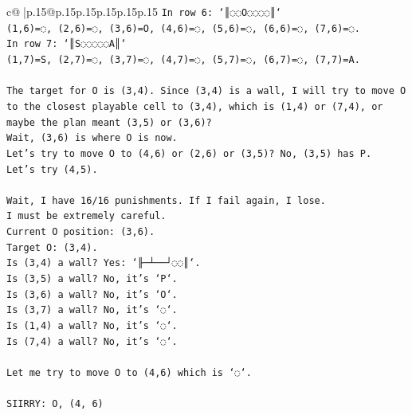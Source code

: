 \documentclass{article}
\begin{document}
{\begin{supertabular}{c@{$\;$}|p{.15\linewidth}@{}p{.15\linewidth}p{.15\linewidth}p{.15\linewidth}p{.15\linewidth}p{.15\linewidth}}
{{{\texttt{In row 6: `║◌◌O◌◌◌◌║`} \\
\texttt{(1,6)=◌, (2,6)=◌, (3,6)=O, (4,6)=◌, (5,6)=◌, (6,6)=◌, (7,6)=◌.} \\
\texttt{In row 7: `║S◌◌◌◌◌A║`} \\
\texttt{(1,7)=S, (2,7)=◌, (3,7)=◌, (4,7)=◌, (5,7)=◌, (6,7)=◌, (7,7)=A.} \\
\\ 
\texttt{The target for O is (3,4). Since (3,4) is a wall, I will try to move O to the closest playable cell to (3,4), which is (1,4) or (7,4), or maybe the plan meant (3,5) or (3,6)?} \\
\texttt{Wait, (3,6) is where O is now.} \\
\texttt{Let's try to move O to (4,6) or (2,6) or (3,5)? No, (3,5) has P.} \\
\texttt{Let's try (4,5).} \\
\\ 
\texttt{Wait, I have 16/16 punishments. If I fail again, I lose.} \\
\texttt{I must be extremely careful.} \\
\texttt{Current O position: (3,6).} \\
\texttt{Target O: (3,4).} \\
\texttt{Is (3,4) a wall? Yes: `╟─┴──┘◌◌║`.} \\
\texttt{Is (3,5) a wall? No, it's `P`.} \\
\texttt{Is (3,6) a wall? No, it's `O`.} \\
\texttt{Is (3,7) a wall? No, it's `◌`.} \\
\texttt{Is (1,4) a wall? No, it's `◌`.} \\
\texttt{Is (7,4) a wall? No, it's `◌`.} \\
\\ 
\texttt{Let me try to move O to (4,6) which is `◌`.} \\
\\ 
\texttt{SIIRRY: O, (4, 6)} \\
            }
        }
    }
     \\ \\


\end{supertabular}}
\end{document}

